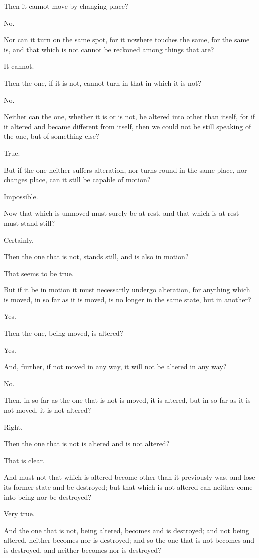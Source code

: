 Then it cannot move by changing place?

No.

Nor can it turn on the same spot, for it nowhere touches the same, for
the same is, and that which is not cannot be reckoned among things that
are?

It cannot.

Then the one, if it is not, cannot turn in that in which it is not?

No.

Neither can the one, whether it is or is not, be altered into other
than itself, for if it altered and became different from itself, then we
could not be still speaking of the one, but of something else?

True.

But if the one neither suffers alteration, nor turns round in the same
place, nor changes place, can it still be capable of motion?

Impossible.

Now that which is unmoved must surely be at rest, and that which is at
rest must stand still?

Certainly.

Then the one that is not, stands still, and is also in motion?

That seems to be true.

But if it be in motion it must necessarily undergo alteration, for
anything which is moved, in so far as it is moved, is no longer in the
same state, but in another?

Yes.

Then the one, being moved, is altered?

Yes.

And, further, if not moved in any way, it will not be altered in any
way?

No.

Then, in so far as the one that is not is moved, it is altered, but in
so far as it is not moved, it is not altered?

Right.

Then the one that is not is altered and is not altered?

That is clear.

And must not that which is altered become other than it previously
was, and lose its former state and be destroyed; but that which is not
altered can neither come into being nor be destroyed?

Very true.

And the one that is not, being altered, becomes and is destroyed; and
not being altered, neither becomes nor is destroyed; and so the one that
is not becomes and is destroyed, and neither becomes nor is destroyed?

